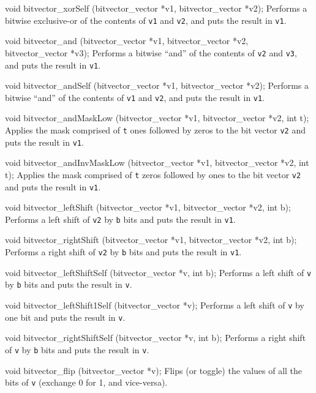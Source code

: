 void bitvector_xorSelf (bitvector_vector *v1, bitvector_vector *v2);
\endcode
 \tab
Performs a bitwise exclusive-or of the contents of \texttt{v1} and \texttt{v2},
and puts the result in \texttt{v1}.
 \endtab
\code

void bitvector_and (bitvector_vector *v1, bitvector_vector *v2, 
                    bitvector_vector *v3);
\endcode
 \tab
Performs a bitwise ``and'' of the contents of \texttt{v2} and \texttt{v3},
and puts the result in \texttt{v1}.
 \endtab
\code

void bitvector_andSelf (bitvector_vector *v1, bitvector_vector *v2);
\endcode
 \tab
Performs a bitwise ``and'' of the contents of \texttt{v1} and \texttt{v2},
and puts the result in \texttt{v1}.
 \endtab
\code

void bitvector_andMaskLow (bitvector_vector *v1, bitvector_vector *v2, int t);
\endcode
 \tab
Applies the mask comprised of {\tt t} ones followed by zeros to the bit vector
{\tt v2} and puts the result in {\tt v1}.
\endtab
\code

void bitvector_andInvMaskLow (bitvector_vector *v1, bitvector_vector *v2, int t);
\endcode
 \tab
Applies the mask comprised of {\tt t} zeros followed by ones to the bit vector
{\tt v2} and puts the result in {\tt v1}.
 \endtab
\code

void bitvector_leftShift (bitvector_vector *v1, bitvector_vector *v2, int b);
\endcode
 \tab
Performs a left shift of \texttt{v2} by \texttt{b} bits
and puts the result in \texttt{v1}.
 \endtab
\code

void bitvector_rightShift (bitvector_vector *v1, bitvector_vector *v2, int b);
\endcode
 \tab
Performs a right shift of \texttt{v2} by \texttt{b} bits
and puts the result in \texttt{v1}.
 \endtab
\code

void bitvector_leftShiftSelf (bitvector_vector *v, int b);
\endcode
 \tab
Performs a left shift of \texttt{v} by \texttt{b} bits
and puts the result in \texttt{v}.
 \endtab
\code

void bitvector_leftShift1Self (bitvector_vector *v);
\endcode
 \tab
Performs a left shift of \texttt{v} by one bit
and puts the result in \texttt{v}.
 \endtab
\code

void bitvector_rightShiftSelf (bitvector_vector *v, int b);
\endcode
 \tab
Performs a right shift of \texttt{v} by \texttt{b} bits
and puts the result in \texttt{v}.
 \endtab
\code

void bitvector_flip (bitvector_vector *v);
\endcode
 \tab
Flips (or toggle) the values of all the bits of {\tt v} (exchange 0 for 1, and vice-versa).
 \endtab
\code


